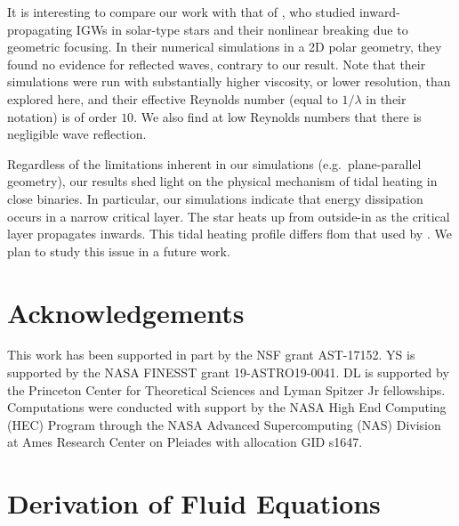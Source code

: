 \documentclass[
        fleqn,
        usenatbib,
    ]{mnras}
\begin{document}
It is interesting to compare our work with that of \citet{barker_ogilvie}, who
studied inward-propagating IGWs in solar-type stars and their nonlinear breaking
due to geometric focusing. In their numerical simulations in a 2D polar
geometry, they found no evidence for reflected waves, contrary to our result.
Note that their simulations were run with substantially higher viscosity, or
lower resolution, than explored here, and their effective Reynolds number (equal
to $1/\lambda$ in their notation) is of order $10$. We also find at low Reynolds
numbers that there is negligible wave reflection.

Regardless of the limitations inherent in our simulations (e.g.\ plane-parallel
geometry), our results shed light on the physical mechanism of tidal heating in
close binaries. In particular, our simulations indicate that energy dissipation
occurs in a narrow critical layer. The star heats up from outside-in as the
critical layer propagates inwards. This tidal heating profile differs flom that
used by \citet{tidal_novae}. We plan to study this issue in a future work.

\section{Acknowledgements}\label{s:ack}

This work has been supported in part by the NSF grant AST-17152. YS is supported
by the NASA FINESST grant 19-ASTRO19-0041.%
DL is supported by the Princeton Center for Theoretical Sciences and Lyman
Spitzer Jr fellowships. Computations were conducted with support by the NASA
High End Computing (HEC) Program through the NASA Advanced Supercomputing (NAS)
Division at Ames Research Center on Pleiades with allocation GID s1647.




\clearpage
\onecolumn
\appendix

\section{Derivation of Fluid Equations}\label{s:equation_deriv}
\end{document}
